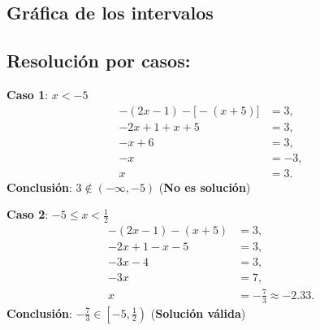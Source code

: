 \subsection*{Gráfica de los intervalos}

\begin{center}
\end{center}

\subsection*{Resolución por casos:}

\textbf{Caso 1}: \(x < -5\)
\begin{align*}
    -(2x-1) - \big[-(x+5)\big] &= 3,\\[1mm]
    -2x+1 + x+5 &= 3,\\[1mm]
    -x+6 &= 3,\\[1mm]
    -x &= -3,\\[1mm]
    x &= 3.
\end{align*}
\textbf{Conclusión}: \(3 \notin (-\infty,-5)\) \quad (\textbf{No es solución})

\textbf{Caso 2}: \(-5 \leq x < \frac{1}{2}\)
\begin{align*}
    -(2x-1) - (x+5) &= 3,\\[1mm]
    -2x+1 - x-5 &= 3,\\[1mm]
    -3x-4 &= 3,\\[1mm]
    -3x &= 7,\\[1mm]
    x &= -\frac{7}{3} \approx -2.33.
\end{align*}
\textbf{Conclusión}: \(-\frac{7}{3} \in \left[-5, \frac{1}{2}\right)\) \quad (\textbf{Solución válida})

